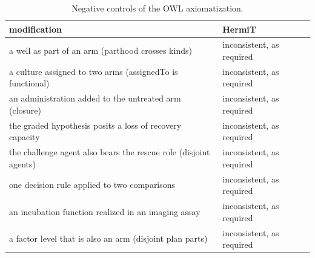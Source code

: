 \documentclass[10pt,a4paper]{article}
\begin{document}
\begin{table}[tbp]\centering\footnotesize
\caption{Negative controls of the OWL axiomatization.}\label{tab:neg2}
\begin{tabularx}{\linewidth}{@{}Xp{4.0cm}@{}}\toprule modification & HermiT \\ \midrule
a well as part of an arm (parthood crosses kinds) & inconsistent, as required \\
a culture assigned to two arms (assignedTo is functional) & inconsistent, as required \\
an administration added to the untreated arm (closure) & inconsistent, as required \\
the graded hypothesis posits a loss of recovery capacity & inconsistent, as required \\
the challenge agent also bears the rescue role (disjoint agents) & inconsistent, as required \\
one decision rule applied to two comparisons & inconsistent, as required \\
an incubation function realized in an imaging assay & inconsistent, as required \\
a factor level that is also an arm (disjoint plan parts) & inconsistent, as required \\
\bottomrule\end{tabularx}\end{table}
\end{document}
